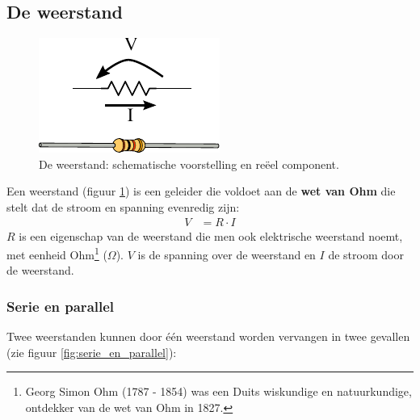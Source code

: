 \documentclass{article}
\begin{document}
		\subsection{De weerstand}
			\begin{figure}[htbp]
				\centering
				\includegraphics{weerstand}
				\caption{De weerstand: schematische voorstelling en re\"eel component.}
				\label{fig:weerstand}
			\end{figure}
			 Een weerstand (figuur \ref{fig:weerstand}) is een geleider die voldoet aan de \textbf{wet van Ohm} die stelt dat de stroom en spanning evenredig zijn: 
			\begin{align}
				V &= R \cdot I
			\end{align} 
			$R$ is een eigenschap van de weerstand die men ook elektrische weerstand noemt, met eenheid Ohm\footnote{Georg Simon Ohm (1787 - 1854) was een Duits wiskundige en natuurkundige, ontdekker van de wet van Ohm in 1827.} ($\Omega$). $V$ is de spanning over de weerstand en $I$ de stroom door de weerstand.



		\subsubsection{Serie en parallel}
			\label{sssec:serie_en_parallel}
			Twee weerstanden kunnen door \'e\'en  weerstand worden vervangen in twee gevallen (zie figuur \ref{fig:serie_en_parallel}):
\end{document}
